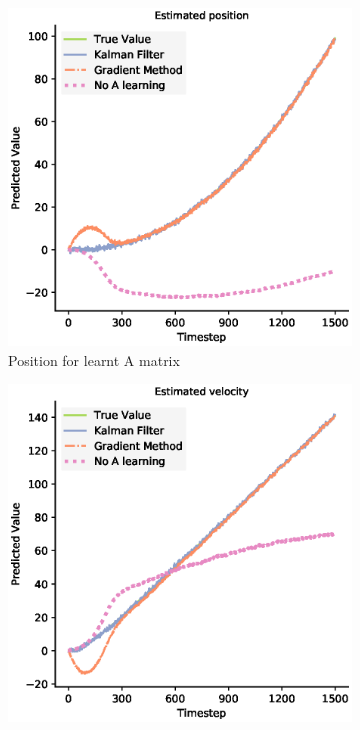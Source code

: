 \begin{figure}[H]
 \begin{subfigure}{0.49\textwidth}
 \centering
 \includegraphics[width=.95\linewidth]{chapter_3_figures/Estimated_position_A_matrix.eps}
 \caption{Position for learnt A matrix}
 \end{subfigure}%
 \begin{subfigure}{0.49\textwidth}
 \centering
 \includegraphics[width=.95\linewidth]{chapter_3_figures/Estimated_velocity_A_matrix.eps}

\end{subfigure}
\end{figure}
